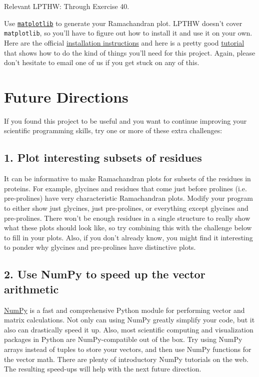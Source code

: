 \documentclass{article}
\newcommand{\module}[2]{\href{#2}{\texttt{#1}}}
\newenvironment{lpthw}
{Relevant LPTHW:}
{}
\begin{document}
\begin{lpthw}
Through Exercise 40.
\end{lpthw}

Use \module{matplotlib}{http://matplotlib.org/users/pyplot_tutorial.html} to 
generate your Ramachandran plot.  LPTHW doesn't cover \texttt{matplotlib}, so 
you'll have to figure out how to install it and use it on your own.  Here are 
the official \href{http://matplotlib.org/users/installing.html} {installation 
instructions} and here is a pretty good
\href{http://matplotlib.org/users/pyplot_tutorial.html}{tutorial} that shows 
how to do the kind of things you'll need for this project.  Again, please don't 
hesitate to email one of us if you get stuck on any of this.

\section{Future Directions}

If you found this project to be useful and you want to continue improving your 
scientific programming skills, try one or more of these extra challenges:

\subsection{1. Plot interesting subsets of residues}

It can be informative to make Ramachandran plots for subsets of the residues in 
proteins.  For example, glycines and residues that come just before prolines 
(i.e. pre-prolines) have very characteristic Ramachandran plots.  Modify your 
program to either show just glycines, just pre-prolines, or everything except 
glycines and pre-prolines.  There won't be enough residues in a single 
structure to really show what these plots should look like, so try combining 
this with the challenge below to fill in your plots.  Also, if you don't 
already know, you might find it interesting to ponder why glycines and 
pre-prolines have distinctive plots.

\subsection{2. Use NumPy to speed up the vector arithmetic}

\href{http://www.numpy.org/}{NumPy} is a fast and comprehensive Python module for performing vector and matrix
calculations. Not only can using NumPy greatly simplify your code, but it also
can drastically speed it up. Also, most scientific computing and visualization packages
in Python are NumPy-compatible out of the box. Try using NumPy arrays instead of tuples
to store your vectors, and then use NumPy functions for the vector math. There are
plenty of introductory NumPy tutorials on the web. The resulting speed-ups will help
with the next future direction.
\end{document}
